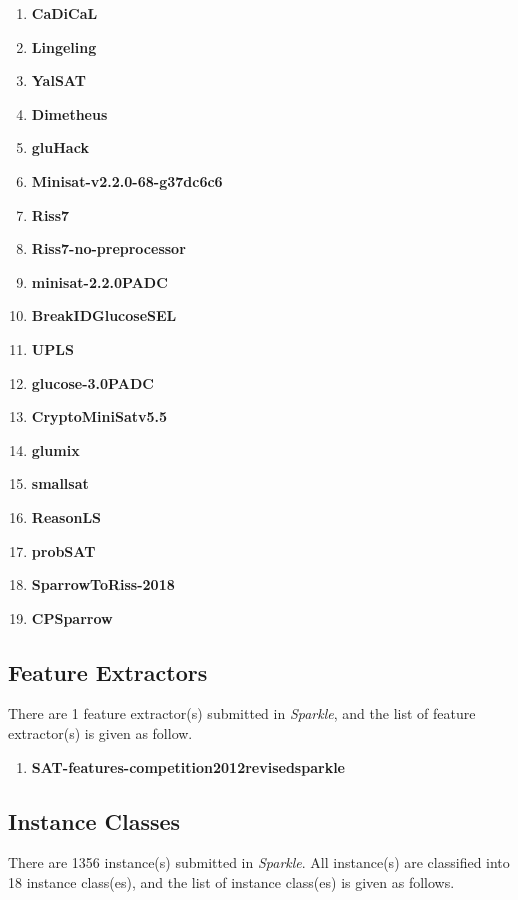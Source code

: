 \documentclass[british]{article}
\begin{document}
\begin{enumerate} 
\item \textbf{CaDiCaL}
\item \textbf{Lingeling}
\item \textbf{YalSAT}
\item \textbf{Dimetheus}
\item \textbf{gluHack}
\item \textbf{Minisat-v2.2.0-68-g37dc6c6}
\item \textbf{Riss7}
\item \textbf{Riss7-no-preprocessor}
\item \textbf{minisat-2.2.0\textunderscore PADC}
\item \textbf{BreakIDGlucoseSEL}
\item \textbf{UPLS}
\item \textbf{glucose-3.0\textunderscore PADC}
\item \textbf{CryptoMiniSatv5.5}
\item \textbf{glu\textunderscore mix}
\item \textbf{smallsat}
\item \textbf{ReasonLS}
\item \textbf{probSAT}
\item \textbf{SparrowToRiss-2018}
\item \textbf{CPSparrow}

\end{enumerate}


\subsection{Feature Extractors}
\label{sec:Feature_Extractors}
There are 1 feature extractor(s) submitted in \emph{Sparkle}, and the list of feature extractor(s) is given as follow.

\begin{enumerate}
\item \textbf{SAT-features-competition2012\textunderscore revised\textunderscore sparkle}

\end{enumerate}

\subsection{Instance Classes}
\label{sec:Instance_Classes}
There are 1356 instance(s) submitted in \emph{Sparkle}. All instance(s) are classified into 18 instance class(es), and the list of instance class(es) is given as follows.
\end{document}
